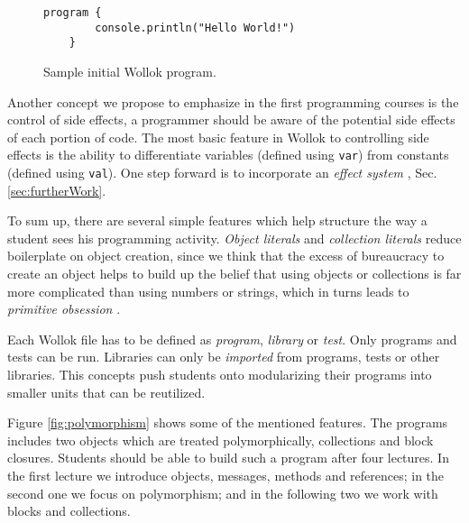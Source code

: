 \begin{figure}[h]
 \centering
 \begin{lstlisting}[language=Wollok]
	program {
		console.println("Hello World!")
	}
 \end{lstlisting}
 
 \caption{\small Sample initial Wollok program.}
 \label{fig:helloWorld/wollok}
\end{figure}

\medskip
Another concept we propose to emphasize in the first programming courses is the control of side effects, 
\ie a programmer should be aware of the potential side effects of each portion of code.
The most basic feature in Wollok to controlling side effects is the ability to 
differentiate variables (defined using \lstinline[language=Wollok]{var})
from constants (defined using \lstinline[language=Wollok]{val}).
One step forward is to incorporate an \emph{effect system} \cite{effect system}, \cf Sec. \ref{sec:furtherWork}.

\medskip
To sum up, there are several simple features which help structure the way a student sees his programming activity.
\emph{Object literals} and \emph{collection literals} reduce boilerplate on object creation, 
since we think that the excess of bureaucracy to create an object helps to build up 
the belief that using objects or collections is far more complicated than using numbers or strings, which in turns leads to \emph{primitive obsession} \cite{primitive obsession}.

Each Wollok file has to be defined as \emph{program}, \emph{library} or \emph{test}.
Only programs and tests can be run. Libraries can only be \emph{imported} from programs, tests or other libraries.
This concepts push students onto modularizing their programs into smaller units that can be reutilized.

Figure \ref{fig:polymorphism} shows some of the mentioned features.
The programs includes two objects which are treated polymorphically, collections and block closures.
Students should be able to build such a program after four lectures.
In the first lecture we introduce objects, messages, methods and references;
in the second one we focus on polymorphism;
and in the following two we work with blocks and collections.

